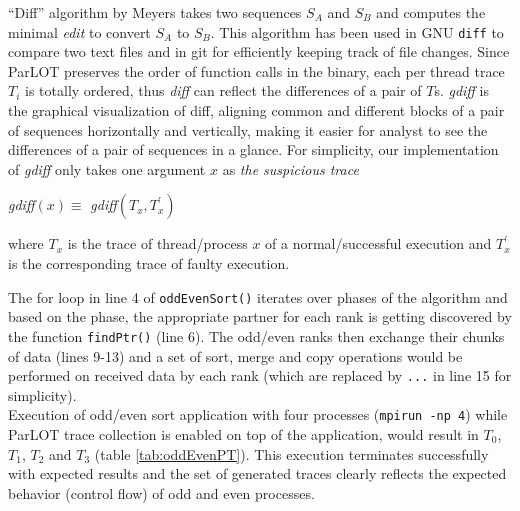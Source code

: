 ``Diff'' algorithm by Meyers \cite{diff-myers} takes two sequences $S_A$ and $S_B$ and computes the minimal \textit{edit} to convert $S_A$ to $S_B$. This algorithm has been used in GNU \texttt{diff} to compare two text files and in git for efficiently keeping track of file changes.
Since ParLOT preserves the order of function calls in the binary, each per thread trace $T_i$ is totally ordered, thus \textit{diff} can reflect the differences of a pair of $T$s. \textit{gdiff} is the graphical visualization of diff, aligning common and different blocks of a pair of sequences horizontally and vertically, making it easier for analyst to see the differences of a pair of sequences in a glance.  
For simplicity, our implementation of \textit{gdiff} only takes one argument $x$ as \textit{the suspicious trace}

\textit{gdiff}$(x) \equiv $ \textit{gdiff}$(T_x,T_x^\prime)$

where $T_x$ is the trace of thread/process $x$ of a normal/successful execution and $T^\prime_x$ is the corresponding trace of faulty execution.



The for loop in line 4 of \texttt{oddEvenSort()} iterates over phases of the algorithm and based on the phase, the appropriate partner for each rank is getting discovered by the function \texttt{findPtr()} (line 6). The odd/even ranks then exchange their chunks of data (lines 9-13) and a set of sort, merge and copy operations would be performed on received data by each rank (which are replaced by \texttt{...} in line 15 for simplicity).
\\

Execution of odd/even sort application with four processes (\texttt{mpirun -np 4}) while ParLOT trace collection is enabled on top of the application, would result in $T_0$, $T_1$, $T_2$ and $T_3$ (table \ref{tab:oddEvenPT}). This execution terminates successfully with expected results and the set of generated traces clearly reflects the expected behavior (control flow) of odd and even processes.
%


 
%


